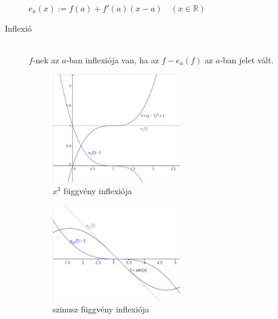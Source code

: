 \documentclass[margin=0px]{article}
\newcommand{\R}{\mathbb{R}}
\begin{document}
\begin{description}
\begin{description}
						$ e_a(x) := f(a) + f'(a)(x-a) \quad (x\in\R)$
 					\item[Inflexió] \hfill \\
	 					$ f$-nek az $a$-ban inflexiója van, ha az $f - e_a(f) $ az $a$-ban jelet vált. 
				\end{description}
				\begin{figure}[H]
					\begin{subfigure}{.33\textwidth}
						\centering
						\includegraphics[width=0.7\textwidth]{img/inflexio_x3.png}
						\caption{$x^3$ függvény inflexiója}
					\end{subfigure}
					\begin{subfigure}{.33\textwidth}
						\centering
						\includegraphics[width=0.7\textwidth]{img/inflexio_sin.png}
						\caption{szinusz függvény inflexiója}
					\end{subfigure}
					\begin{subfigure}{.33\textwidth}
						\centering

\end{subfigure}
\end{figure}
\end{description}
\end{document}

